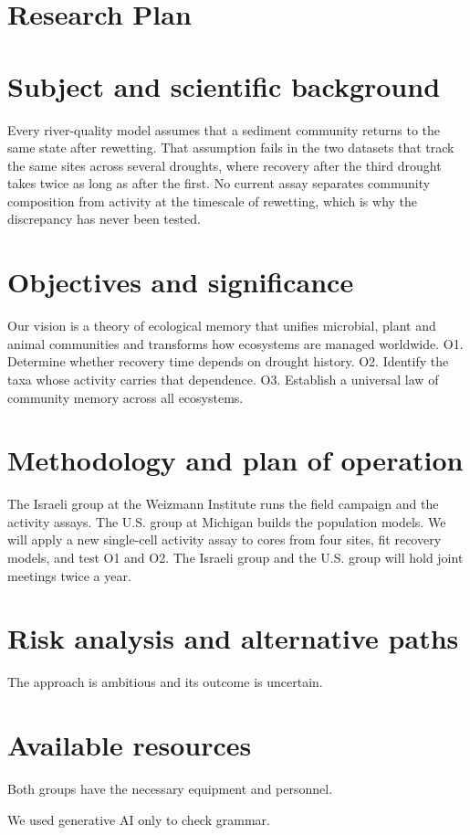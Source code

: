 \documentclass[12pt,a4paper]{article}
\begin{document}
\section*{Research Plan}

\section{Subject and scientific background}
Every river-quality model assumes that a sediment community returns to the same state after
rewetting. That assumption fails in the two datasets that track the same sites across several
droughts, where recovery after the third drought takes twice as long as after the first. No
current assay separates community composition from activity at the timescale of rewetting,
which is why the discrepancy has never been tested.

\section{Objectives and significance}
Our vision is a theory of ecological memory that unifies microbial, plant and animal
communities and transforms how ecosystems are managed worldwide.
O1. Determine whether recovery time depends on drought history.
O2. Identify the taxa whose activity carries that dependence.
O3. Establish a universal law of community memory across all ecosystems.

\section{Methodology and plan of operation}
The Israeli group at the Weizmann Institute runs the field campaign and the activity assays.
The U.S. group at Michigan builds the population models. We will apply a new single-cell
activity assay to cores from four sites, fit recovery models, and test O1 and O2.
The Israeli group and the U.S. group will hold joint meetings twice a year.

\section{Risk analysis and alternative paths}
The approach is ambitious and its outcome is uncertain.

\section{Available resources}
Both groups have the necessary equipment and personnel.

We used generative AI only to check grammar.
\end{document}
